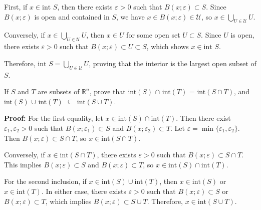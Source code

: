 First, if $x \in \text{int } S$, then there exists $\varepsilon > 0$ such that $B(x;\varepsilon) \subset S$. Since $B(x;\varepsilon)$ is open and contained in $S$, we have $x \in B(x;\varepsilon) \in \mathcal{U}$, so $x \in \bigcup_{U \in \mathcal{U}} U$.

Conversely, if $x \in \bigcup_{U \in \mathcal{U}} U$, then $x \in U$ for some open set $U \subset S$. Since $U$ is open, there exists $\varepsilon > 0$ such that $B(x;\varepsilon) \subset U \subset S$, which shows $x \in \text{int } S$.

Therefore, $\text{int } S = \bigcup_{U \in \mathcal{U}} U$, proving that the interior is the largest open subset of $S$.

\begin{problembox}
If $S$ and $T$ are subsets of $\mathbb{R}^n$, prove that
int$(S)$ $\cap$ int$(T)$ = int$(S \cap T)$,
and int$(S)$ $\cup$ int$(T)$ $\subseteq$ int$(S \cup T)$.
\end{problembox}    

\textbf{Proof:} For the first equality, let $x \in \text{int}(S) \cap \text{int}(T)$. Then there exist $\varepsilon_1, \varepsilon_2 > 0$ such that $B(x;\varepsilon_1) \subset S$ and $B(x;\varepsilon_2) \subset T$. Let $\varepsilon = \min\{\varepsilon_1, \varepsilon_2\}$. Then $B(x;\varepsilon) \subset S \cap T$, so $x \in \text{int}(S \cap T)$.

Conversely, if $x \in \text{int}(S \cap T)$, there exists $\varepsilon > 0$ such that $B(x;\varepsilon) \subset S \cap T$. This implies $B(x;\varepsilon) \subset S$ and $B(x;\varepsilon) \subset T$, so $x \in \text{int}(S) \cap \text{int}(T)$.

For the second inclusion, if $x \in \text{int}(S) \cup \text{int}(T)$, then $x \in \text{int}(S)$ or $x \in \text{int}(T)$. In either case, there exists $\varepsilon > 0$ such that $B(x;\varepsilon) \subset S$ or $B(x;\varepsilon) \subset T$, which implies $B(x;\varepsilon) \subset S \cup T$. Therefore, $x \in \text{int}(S \cup T)$.


